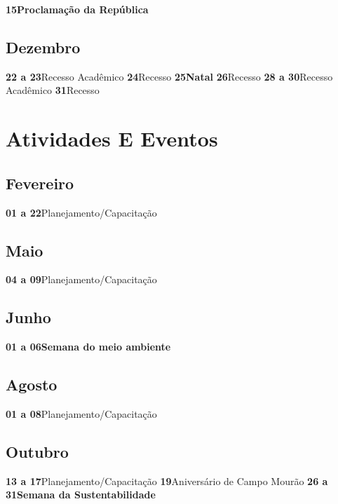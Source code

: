 \documentclass[thesis]{hmcposter}
\begin{document}
\begin{poster}
\newline\textbf{15}\quad \quad \quad \quad \textbf{Proclamação da República} \newline\subsection{Dezembro}\textbf{22 a 23}\quad \quad Recesso Acadêmico \newline\textbf{24}\quad \quad \quad \quad Recesso \newline\textbf{25}\quad \quad \quad \quad \textbf{Natal} \newline\textbf{26}\quad \quad \quad \quad Recesso \newline\textbf{28 a 30}\quad \quad Recesso Acadêmico \newline\textbf{31}\quad \quad \quad \quad Recesso \newline\newpage
\normalsize \section{\color{hmcorange}Atividades E Eventos}\subsection{Fevereiro}\textbf{01 a 22}\quad \quad Planejamento/Capacitação \newline\subsection{Maio}\textbf{04 a 09}\quad \quad Planejamento/Capacitação \newline\subsection{Junho}\textbf{01 a 06}\quad \quad \textbf{Semana do meio ambiente} \newline\subsection{Agosto}\textbf{01 a 08}\quad \quad Planejamento/Capacitação \newline\subsection{Outubro}\textbf{13 a 17}\quad \quad Planejamento/Capacitação \newline\textbf{19}\quad \quad \quad \quad Aniversário de Campo Mourão \newline\textbf{26 a 31}\quad \quad \textbf{Semana da Sustentabilidade} \newline\end{poster}
\end{document}
